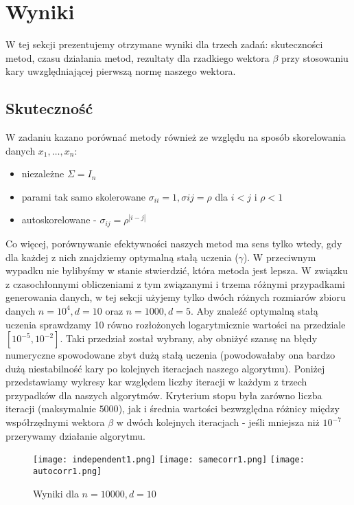 \documentclass[a4paper]{article}
\begin{document}
\section{Wyniki}
W tej sekcji prezentujemy otrzymane wyniki dla trzech zadań: skuteczności metod, czasu działania metod, rezultaty dla rzadkiego wektora $\beta$ przy stosowaniu kary uwzględniającej pierwszą normę naszego wektora.
\subsection{Skuteczność}
W zadaniu kazano porównać metody również ze względu na sposób skorelowania danych $x_1, \ldots, x_n$:
\begin{itemize}
\item niezależne $\Sigma = I_n$
\item parami tak samo skolerowane $\sigma_{ii}=1, \sigma{ij} = \rho$ dla $i<j$ i $\rho<1$
\item autoskorelowane - $\sigma_{ij} = \rho^{|i-j|}$
\end{itemize}
Co więcej, porównywanie efektywności naszych metod ma sens tylko wtedy, gdy dla każdej z nich znajdziemy optymalną stałą uczenia ($\gamma$). W przeciwnym wypadku nie bylibyśmy w stanie stwierdzić, która metoda jest lepsza. W związku z czasochłonnymi obliczeniami z tym związanymi i trzema różnymi przypadkami generowania danych, w tej sekcji użyjemy tylko dwóch różnych rozmiarów zbioru danych $n=10^4, d=10$ oraz $n=1000, d=5$. Aby znaleźć optymalną stałą uczenia sprawdzamy 10 równo rozłożonych logarytmicznie wartości na przedziale $[10^{-5}, 10^{-2}]$. Taki przedział został wybrany, aby obniżyć szansę na błędy numeryczne spowodowane zbyt dużą stałą uczenia (powodowałaby ona bardzo dużą niestabilność kary po kolejnych iteracjach naszego algorytmu). Poniżej przedstawiamy wykresy kar względem liczby iteracji w każdym z trzech przypadków dla naszych algorytmów. Kryterium stopu była zarówno liczba iteracji (maksymalnie $5000$), jak i średnia wartości bezwzględna różnicy między współrzędnymi wektora $\beta$ w dwóch kolejnych iteracjach - jeśli mniejsza niż $10^{-7}$ przerywamy działanie algorytmu.

\begin{figure}[H]
\caption{Wyniki dla $n=10000, d=10$}
  \texttt{[image: independent1.png]}
\endminipage \hfill 
{}
  \texttt{[image: samecorr1.png]}
\endminipage \hfill 
{}
  \texttt{[image: autocorr1.png]}
\endminipage \hfill 
\end{figure}
\end{document}
